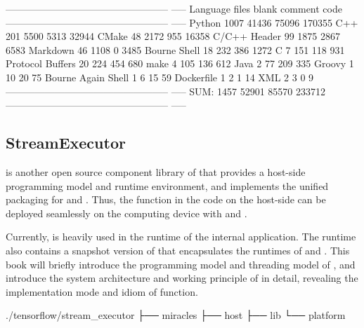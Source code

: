 \begin{content}
\begin{leftbar}
\begin{python}[caption={Contrib Code Statistics}]
-------------------------------------------------- -----
Language            files     blank   comment      code
-------------------------------------------------- -----
Python               1007     41436     75096    170355
C++                   201      5500      5313     32944
CMake                  48      2172       955     16358
C/C++ Header           99      1875      2867      6583
Markdown 46 1108 0 3485
Bourne Shell           18       232       386      1272
C                       7       151       118       931
Protocol Buffers       20       224       454       680
make                    4       105       136       612
Java                    2        77       209       335
Groovy                  1        10        20        75
Bourne Again Shell      1         6        15        59
Dockerfile              1         2         1        14
XML                     2         3         0         9
-------------------------------------------------- -----
SUM:                 1457     52901     85570    233712
-------------------------------------------------- -----
\end{python}
\end{leftbar}


\subsection{StreamExecutor}
 is another open source component library of  that provides a host-side programming model and runtime environment, and implements the unified packaging for  and . Thus, the  function in the code on the host-side can be deployed seamlessly on the computing device with  and .

Currently,  is heavily used in the runtime of the  internal application. The \tf{} runtime also contains a snapshot version of  that encapsulates the runtimes of  and . This book will briefly introduce the programming model and threading model of , and introduce the system architecture and working principle of  in detail, revealing the implementation mode and idiom of  function.

\begin{leftbar}
\begin{c++}[caption={StreamExecutorSource Structure}]
./tensorflow/stream_executor
├── miracles
├── host
├── lib
└── platform
\end{c++}
\end{leftbar}


\end{content}
